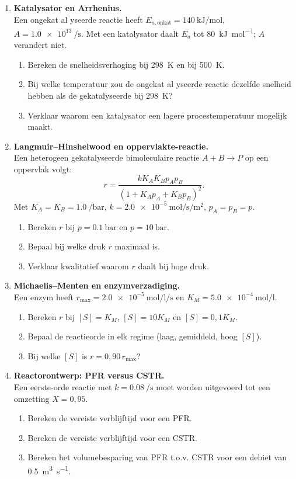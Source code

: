 \begin{enumerate}
\item \textbf{Katalysator en Arrhenius.} \\
Een ongekat \-al yseerde reactie heeft $E_{a,\text{onkat}} = \SI{140}{\kilo\joule\per\mole}$, $A = \SI{1.0e13}{\per\second}$. Met een katalysator daalt $E_a$ tot \SI{80}{\kilo\joule\per\mole}; $A$ verandert niet.
\begin{enumerate}
\item[(a)] Bereken de snelheidsverhoging bij \SI{298}{\kelvin} en bij \SI{500}{\kelvin}.
\item[(b)] Bij welke temperatuur zou de ongekat \-al yseerde reactie dezelfde snelheid hebben als de gekatalyseerde bij \SI{298}{\kelvin}?
\item[(c)] Verklaar waarom een katalysator een lagere procestemperatuur mogelijk maakt.
\end{enumerate}

\item \textbf{Langmuir--Hinshelwood en oppervlakte-reactie.} \\
Een heterogeen gekatalyseerde bimoleculaire reactie $A + B \rightarrow P$ op een oppervlak volgt:
\[
r = \frac{k K_A K_B p_A p_B}{(1 + K_A p_A + K_B p_B)^2}.
\]
Met $K_A = K_B = \SI{1.0}{\per\bar}$, $k = \SI{2.0e-5}{\mole\per\second\per\meter\squared}$, $p_A = p_B = p$.
\begin{enumerate}
\item[(a)] Bereken $r$ bij $p = \SI{0.1}{\bar}$ en $p = \SI{10}{\bar}$.
\item[(b)] Bepaal bij welke druk $r$ maximaal is.
\item[(c)] Verklaar kwalitatief waarom $r$ daalt bij hoge druk.
\end{enumerate}

\item \textbf{Michaelis--Menten en enzymverzadiging.} \\
Een enzym heeft $r_{\max} = \SI{2.0e-5}{\mole\per\litre\per\second}$ en $K_M = \SI{5.0e-4}{\mole\per\litre}$.
\begin{enumerate}
\item[(a)] Bereken $r$ bij $[S] = K_M$, $[S] = 10 K_M$ en $[S] = 0{,}1 K_M$.
\item[(b)] Bepaal de reactieorde in elk regime (laag, gemiddeld, hoog $[S]$).
\item[(c)] Bij welke $[S]$ is $r = 0{,}90\,r_{\max}$?
\end{enumerate}

\item \textbf{Reactorontwerp: PFR versus CSTR.} \\
Een eerste-orde reactie met $k = \SI{0.08}{\per\second}$ moet worden uitgevoerd tot een omzetting $X = 0{,}95$.
\begin{enumerate}
\item[(a)] Bereken de vereiste verblijftijd voor een PFR.
\item[(b)] Bereken de vereiste verblijftijd voor een CSTR.
\item[(c)] Bereken het volumebesparing van PFR t.o.v. CSTR voor een debiet van \SI{0.5}{\metre\cubed\per\second}.
\end{enumerate}


\end{enumerate}
